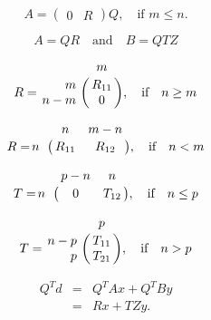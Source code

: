 {\newpage\clearpage
{}%
\begin{displaymath}
A = \left( \begin{array}{cc} 0 & R \end{array} \right) Q,
\quad \mbox{if $m \leq n$.}
\end{displaymath}%
\lthtmldisplayZ
\lthtmlcheckvsize\clearpage}

{\newpage\clearpage
{}%
\begin{displaymath}
A = Q R \quad  \mbox{and} \quad B = Q T Z
\end{displaymath}%
\lthtmldisplayZ
\lthtmlcheckvsize\clearpage}

{\newpage\clearpage
{}%
\begin{displaymath}
R = \bordermatrix{    & m   \cr
        \hfill    m   & R_{11} \cr
                  n-m & 0      },   \quad \mbox{if} \quad n \geq m
\end{displaymath}%
\lthtmldisplayZ
\lthtmlcheckvsize\clearpage}

{\newpage\clearpage
{}%
\begin{displaymath}
R = \bordermatrix{    & n      &   m-n    \cr
                  n   & R_{11} &  R_{12}  }, \quad \mbox{if} \quad n < m
\end{displaymath}%
\lthtmldisplayZ
\lthtmlcheckvsize\clearpage}

{\newpage\clearpage
{}%
\begin{displaymath}
T = \bordermatrix{    & p-n    &   n    \cr
                  n   & 0      &  T_{12}  }, \quad \mbox{if} \quad n \leq p
\end{displaymath}%
\lthtmldisplayZ
\lthtmlcheckvsize\clearpage}

{\newpage\clearpage
{}%
\begin{displaymath}
T = \bordermatrix{    & p   \cr
                  n-p & T_{11} \cr
         \hfill   p   & T_{21} },   \quad \mbox{if} \quad n > p
\end{displaymath}%
\lthtmldisplayZ
\lthtmlcheckvsize\clearpage}

{\newpage\clearpage
{}%
\begin{eqnarray*}
Q^T d & = & Q^T A x + Q^T B y \\
      & = & R x + T Z y.
\end{eqnarray*}%
\lthtmldisplayZ
\lthtmlcheckvsize\clearpage}


